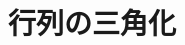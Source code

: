\documentclass[../../topic_linear-algebra]{subfiles}
\begin{document}
\chapter{行列の三角化}
\end{document}
